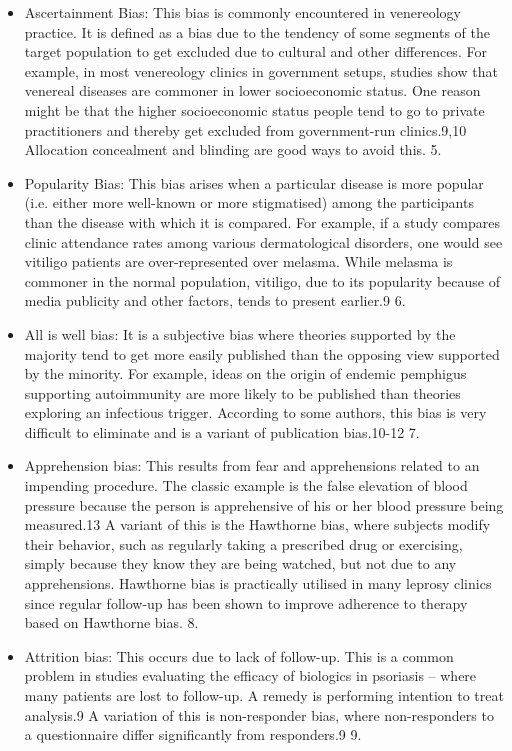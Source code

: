 \documentclass[12pt, a4paper, oneside]{book}   	%
\begin{document}
\begin{itemize}
				\item Ascertainment Bias: This bias is commonly encountered in venereology practice. It is defined as a bias due to the tendency of some segments of the target population to get excluded due to cultural and other differences. For example, in most venereology clinics in government setups, studies show that venereal diseases are commoner in lower socioeconomic status. One reason might be that the higher socioeconomic status people tend to go to private practitioners and thereby get excluded from government-run clinics.9,10 Allocation concealment and blinding are good ways to avoid this. 5. \autocite{Chakraborty_2023}
				\item Popularity Bias: This bias arises when a particular disease is more popular (i.e. either more well-known or more stigmatised) among the participants than the disease with which it is compared. For example, if a study compares clinic attendance rates among various dermatological disorders, one would see vitiligo patients are over-represented over melasma. While melasma is commoner in the normal population, vitiligo, due to its popularity because of media publicity and other factors, tends to present earlier.9 6. \autocite{Chakraborty_2023}
				\item All is well bias: It is a subjective bias where theories supported by the majority tend to get more easily published than the opposing view supported by the minority. For example, ideas on the origin of endemic pemphigus supporting autoimmunity are more likely to be published than theories exploring an infectious trigger. According to some authors, this bias is very difficult to eliminate and is a variant of publication bias.10-12 7.\autocite{Chakraborty_2023}
				\item  Apprehension bias: This results from fear and apprehensions related to an impending procedure. The classic example is the false elevation of blood pressure because the person is apprehensive of his or her blood pressure being measured.13 A variant of this is the Hawthorne bias, where subjects modify their behavior, such as regularly taking a prescribed drug or exercising, simply because they know they are being watched, but not due to any apprehensions. Hawthorne bias is practically utilised in many leprosy clinics since regular follow-up has been shown to improve adherence to therapy based on Hawthorne bias. 8. \autocite{Chakraborty_2023}
				\item Attrition bias: This occurs due to lack of follow-up. This is a common problem in studies evaluating the efficacy of biologics in psoriasis – where many patients are lost to follow-up. A remedy is performing intention to treat analysis.9 A variation of this is non-responder bias, where non-responders to a questionnaire differ significantly from responders.9 9. \autocite{Chakraborty_2023}

\end{itemize}
\end{document}
